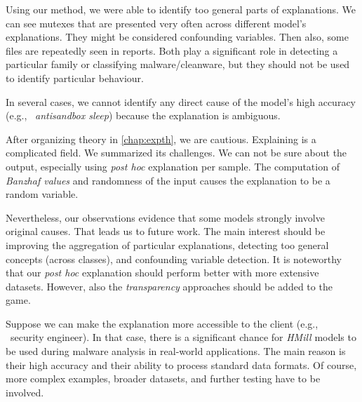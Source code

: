 Using our method, we were able to identify too general parts of explanations. We can see mutexes that are presented very often across different model's explanations. They might be considered confounding variables. Then also, some files are repeatedly seen in reports. Both play a significant role in detecting a particular family or classifying malware/cleanware, but they should not be used to identify particular behaviour.

In several cases, we cannot identify any direct cause of the model's high accuracy (e.g., \ \emph{antisandbox sleep}) because the explanation is ambiguous.

\hfill \break

After organizing theory in \ref{chap:expth}, we are cautious. Explaining is a complicated field. We summarized its challenges. We can not be sure about the output, especially using \emph{post hoc} explanation per sample. The computation of \emph{Banzhaf values} and randomness of the input causes the explanation to be a random variable. 

Nevertheless, our observations evidence that some models strongly involve original causes. That leads us to future work. The main interest should be improving the aggregation of particular explanations, detecting too general concepts (across classes), and confounding variable detection. It is noteworthy that our \emph{post hoc} explanation should perform better with more extensive datasets. However, also the \emph{transparency} approaches should be added to the game. 

Suppose we can make the explanation more accessible to the client (e.g., \ security engineer). In that case, there is a significant chance for \emph{HMill} models to be used during malware analysis in real-world applications. The main reason is their high accuracy and their ability to process standard data formats. Of course, more complex examples, broader datasets, and further testing have to be involved.
